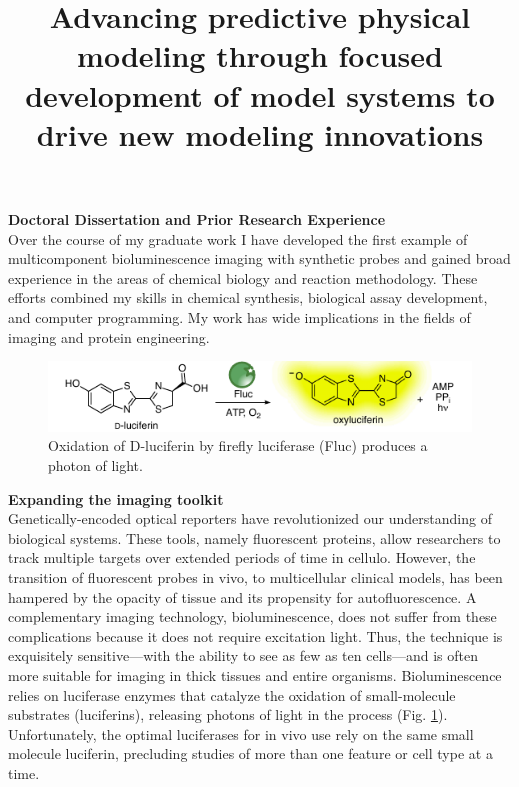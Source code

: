 \documentclass[11pt]{article}
\title{ Advancing predictive physical modeling through focused development of model systems to drive new modeling innovations}
\begin{document}
\textbf{Doctoral Dissertation and Prior Research Experience}\\
Over the course of my graduate work I have developed the first example of multicomponent bioluminescence imaging with synthetic probes and gained broad experience in the areas of chemical biology and reaction methodology. These efforts combined my skills in chemical synthesis, biological assay development, and computer programming. My work has wide implications in the fields of imaging and protein engineering.

\begin{figure}
\vspace{-0.2in}
\begin{centering}
\includegraphics[width=\textwidth]{figures/Previous_research/luc_oxidation.pdf}

\end{centering}
\footnotesize
\caption{\label{figure:chemilum}
Oxidation of D-luciferin by firefly luciferase (Fluc) produces a photon of light.
}
\end{figure}

\textbf{Expanding the imaging toolkit}\\
Genetically-encoded optical reporters have revolutionized our understanding of biological systems. These tools, namely fluorescent proteins, allow researchers to track multiple targets over extended periods of time in cellulo. However, the transition of fluorescent probes in vivo, to multicellular clinical models, has been hampered by the opacity of tissue and its propensity for autofluorescence. A complementary imaging technology, bioluminescence, does not suffer from these complications because it does not require excitation light.
Thus, the technique is exquisitely sensitive—with the ability to see as few as ten cells—and is often more suitable for imaging in thick tissues and entire organisms. Bioluminescence relies on luciferase enzymes that catalyze the oxidation of small-molecule substrates (luciferins), releasing photons of light in the process (Fig. \ref{figure:chemilum}). Unfortunately, the optimal luciferases for in vivo use rely on the same small molecule luciferin, precluding studies of more than one feature or cell type at a time.
\end{document}
